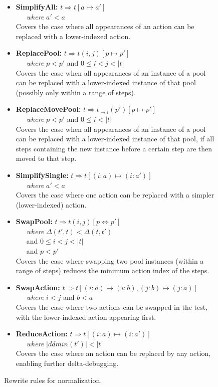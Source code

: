\begin{figure}[t]
{%
\begin{itemize}
\item {\bf SimplifyAll:}
$t \Rightarrow t[a \mapsto a']$\\
\-\ \ \ \emph{where} $a' < a$\\
Covers the case where all appearances of an action can be replaced with a 
lower-indexed action. 
\item {\bf ReplacePool:}
$t \Rightarrow t(i,j)[p \mapsto p']$\\ 
\-\ \ \ \emph{where} $p < p'$ and $0 \leq i < j <
|t|$\\
Covers the case when all appearances of an instance of a pool can be replaced with 
a lower-indexed instance of that pool (possibly only within a range of steps).
\item {\bf ReplaceMovePool:}
$t \Rightarrow t_{\rightarrow i}(p')[p \mapsto p']$\\
\-\ \ \ \emph{where} $p < p'$ and $0
\leq i < |t|$\\
Covers the case when all appearances of an instance of a pool can be replaced with
a lower-indexed instance of that pool, if all steps containing the new instance before a
certain step are then moved to that step.
\item {\bf SimplifySingle:}
$t \Rightarrow t[(i: a) \mapsto (i: a')]$\\
\-\ \ \ \emph{where} $a' < a$\\
Covers the case where one action can be replaced with a 
simpler (lower-indexed) action. 
\item {\bf SwapPool:}
$t \Rightarrow t(i,j)[p \Leftrightarrow p']$\\
\-\ \ \ \emph{where} $\Delta(t',t) < \Delta(t,t')$\\
\-\ \ \ and $0 \leq i < j < |t|$\\
\-\ \ \ and $p < p'$\\
Covers the case where swapping two pool instances (within a range of steps) reduces
the minimum action index of the steps.
\item {\bf SwapAction:}
$t \Rightarrow t[(i: a) \mapsto (i: b), (j: b) \mapsto (j: a)]$\\
\-\ \ \ \emph{where} $i < j$ and
$b < a$\\
Covers the case where two actions can be swapped in the test, with the
lower-indexed action appearing first.
\item {\bf ReduceAction:}
$t \Rightarrow t[(i: a) \mapsto (i: a')]$\\
\-\ \ \ \emph{where} $|ddmin(t')| < |t|$\\
Covers the case where an action can be replaced by any action, enabling further delta-debugging.
\end{itemize}
}
\caption{Rewrite rules for normalization.}
\label{fig:rewrite}
\end{figure}

